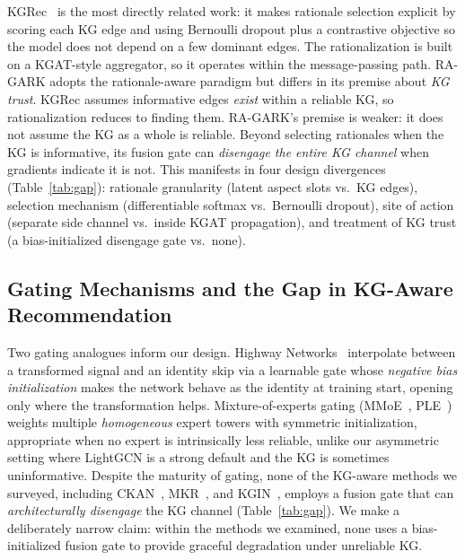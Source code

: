 \documentclass[12pt,a4paper]{article}
\begin{document}
KGRec~\cite{yang2023kgrec} is the most directly related work: it makes rationale selection explicit by scoring each KG edge and using Bernoulli dropout plus a contrastive objective so the model does not depend on a few dominant edges. The rationalization is built on a KGAT-style aggregator, so it operates within the message-passing path. RA-GARK adopts the rationale-aware paradigm but differs in its premise about \emph{KG trust}. KGRec assumes informative edges \emph{exist} within a reliable KG, so rationalization reduces to finding them. RA-GARK's premise is weaker: it does not assume the KG as a whole is reliable. Beyond selecting rationales when the KG is informative, its fusion gate can \emph{disengage the entire KG channel} when gradients indicate it is not. This manifests in four design divergences (Table~\ref{tab:gap}): rationale granularity (latent aspect slots vs.\ KG edges), selection mechanism (differentiable softmax vs.\ Bernoulli dropout), site of action (separate side channel vs.\ inside KGAT propagation), and treatment of KG trust (a bias-initialized disengage gate vs.\ none).

\subsection{Gating Mechanisms and the Gap in KG-Aware Recommendation}

Two gating analogues inform our design. Highway Networks~\cite{srivastava2015highway} interpolate between a transformed signal and an identity skip via a learnable gate whose \emph{negative bias initialization} makes the network behave as the identity at training start, opening only where the transformation helps. Mixture-of-experts gating (MMoE~\cite{ma2018mmoe}, PLE~\cite{tang2020ple}) weights multiple \emph{homogeneous} expert towers with symmetric initialization, appropriate when no expert is intrinsically less reliable, unlike our asymmetric setting where LightGCN is a strong default and the KG is sometimes uninformative. Despite the maturity of gating, none of the KG-aware methods we surveyed, including CKAN~\cite{wang2020ckan}, MKR~\cite{wang2019mkr}, and KGIN~\cite{wang2021kgin}, employs a fusion gate that can \emph{architecturally disengage} the KG channel (Table~\ref{tab:gap}). We make a deliberately narrow claim: within the methods we examined, none uses a bias-initialized fusion gate to provide graceful degradation under unreliable KG.
\end{document}
